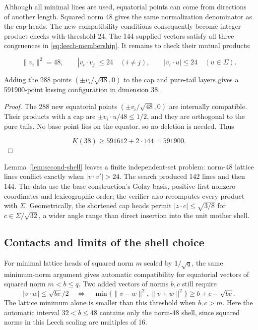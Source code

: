 Although all minimal lines are used, equatorial points can come from
directions of another length. Squared norm 48 gives the same normalization
denominator as the cap heads. The new compatibility conditions consequently
become integer-product checks with threshold 24.
The 144 supplied vectors satisfy all three congruences in
\eqref{eq:leech-membership}. It remains to check their mutual products:

\[
\|v_i\|^2=48,\qquad
|v_i\cdot v_j|\le24\quad(i\ne j),\qquad
|v_i\cdot u|\le24\quad(u\in\Sigma).
\]

\begin{proposition}
\label{prop:equatorial}
Adding the 288 points $(\pm v_i/\sqrt{48},0)$ to the cap and pure-tail
layers gives a 591900-point kissing configuration in dimension 38.
\end{proposition}
\begin{proof}
The 288 new equatorial points \((\pm v_i/\sqrt{48},0)\) are internally
compatible. Their products with a cap are \(\pm v_i\cdot u/48\le1/2\),
and they are orthogonal to the pure tails. No base point lies on the
equator, so no deletion is needed. Thus

\[
K(38)\ge591612+2\cdot144=591900.
\]
\end{proof}

Lemma~\ref{lem:second-shell} leaves a finite independent-set problem:
norm-48 lattice lines conflict exactly when $|v\cdot v'|>24$.
The search produced 142 lines and then 144. The data use the base
construction's Golay basis, positive first nonzero coordinates and
lexicographic order; the verifier also recomputes every product with
$\Sigma$. Geometrically, the shortened cap heads permit
$|z\cdot c|\le\sqrt{3/8}$ for $c\in\Sigma/\sqrt{32}$, a wider angle
range than direct insertion into the unit mother shell.

\subsection{Contacts and limits of the shell choice}

For minimal lattice heads of squared norm $m$ scaled by $1/\sqrt q$,
the same minimum-norm argument gives automatic compatibility for
equatorial vectors of squared norm $m<b\le q$. Two added vectors of
norms $b,c$ still require
\[
|v\cdot w|\le\sqrt{bc}/2
\quad\Longleftrightarrow\quad
\min\{\|v-w\|^2,\|v+w\|^2\}\ge b+c-\sqrt{bc}.
\]
The lattice minimum alone is smaller than this threshold when $b,c>m$.
Here the automatic interval $32<b\le48$ contains only the norm-48
shell, since squared norms in this Leech scaling are multiples of 16.

